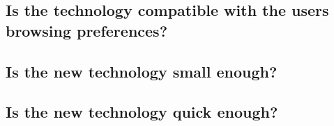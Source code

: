 \subsection{Is the technology compatible with the users browsing preferences?}

\subsection{Is the new technology small enough?}

\subsection{Is the new technology quick enough?}

